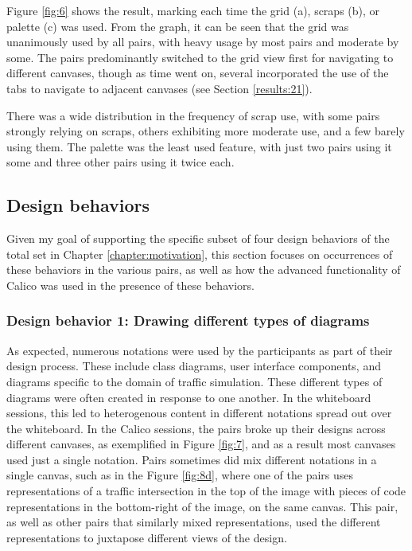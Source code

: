 Figure \ref{fig:6} shows the result, marking each time the grid (a), scraps (b), or palette (c) was used. From the graph, it can be seen that the grid was unanimously used by all pairs, with heavy usage by most pairs and moderate by some. The pairs predominantly switched to the grid view first for navigating to different canvases, though as time went on, several incorporated the use of the tabs to navigate to adjacent canvases (see Section \ref{results:21}). 

There was a wide distribution in the frequency of scrap use, with some pairs strongly relying on scraps, others exhibiting more moderate use, and a few barely using them. The palette was the least used feature, with just two pairs using it some and three other pairs using it twice each.

\subsection{Design behaviors}
\label{results:2}

Given my goal of supporting the specific subset of four design behaviors of the total set in Chapter \ref{chapter:motivation}, this section focuses on occurrences of these behaviors in the various pairs, as well as how the advanced functionality of Calico was used in the presence of these behaviors.

\subsubsection{Design behavior 1: Drawing different types of diagrams}
\label{results:23}

As expected, numerous notations were used by the participants as part of their design process. These include class diagrams, user interface components, and diagrams specific to the domain of traffic simulation. These different types of diagrams were often created in response to one another. In the whiteboard sessions, this led to heterogenous content in different notations spread out over the whiteboard. In the Calico sessions, the pairs broke up their designs across different canvases, as exemplified in Figure \ref{fig:7}, and as a result most canvases used just a single notation. Pairs sometimes did mix different notations in a single canvas, such as in the Figure \ref{fig:8d}, where one of the pairs uses representations of a traffic intersection in the top of the image with pieces of code representations in the bottom-right of the image, on the same canvas. This pair, as well as other pairs that similarly mixed representations, used the different representations to juxtapose different views of the design.

